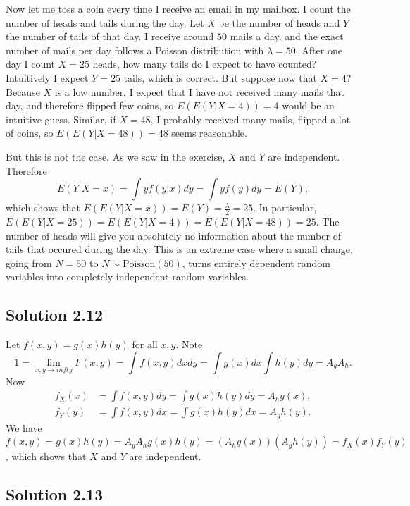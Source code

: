 Now let me toss a coin every time I receive an email in my mailbox.
I count the number of heads and tails during the day.
Let $X$ be the number of heads and $Y$ the number of tails of that day.
I receive around $50$ mails a day, and the exact number of mails per day follows a Poisson distribution with $\lambda = 50$.
After one day I count $X = 25$ heads, how many tails do I expect to have counted?
Intuitively I expect $Y = 25$ tails, which is correct.
But suppose now that $X = 4$?
Because $X$ is a low number, I expect that I have not received many mails that day, and therefore flipped few coins, so $E(E(Y | X = 4)) = 4$ would be an intuitive guess.
Similar, if $X = 48$, I probably received many mails, flipped a lot of coins, so $E(E(Y | X = 48)) = 48$ seems reasonable.

But this is not the case.
As we saw in the exercise, $X$ and $Y$ are independent.
Therefore
$$
E(Y | X = x) = \int y f(y|x) dy = \int y f(y) dy = E(Y),
$$
which shows that $E(E(Y | X = x)) = E(Y) = \frac{\lambda}{2} = 25$.
In particular, $E(E(Y | X = 25)) = E(E(Y | X = 4)) = E(E(Y | X = 48)) = 25$.
The number of heads will give you absolutely no information about the number of tails that occured during the day.
This is an extreme case where a small change, going from $N = 50$ to $N \sim \mathrm{Poisson}(50)$, turns entirely dependent random variables into completely independent random variables.


\subsection*{Solution 2.12}

Let $f(x, y) = g(x) h(y)$ for all $x, y$.
Note
$$
1 = \lim_{x, y \to infty} F(x, y) = \int f(x, y) dx dy = \int g(x) dx \int h(y) dy = A_g A_h.
$$
Now
\begin{equation*}
    \begin{split}
        f_X(x) &= \int f(x, y) dy = \int g(x) h(y) dy = A_h g(x), \\
        f_Y(y) &= \int f(x, y) dx = \int g(x) h(y) dx = A_g h(y).
    \end{split}
\end{equation*}
We have $f(x, y) = g(x) h(y) = A_g A_h g(x) h(y) = (A_h g(x))(A_g h(y)) = f_X(x) f_Y(y)$, which shows that $X$ and $Y$ are independent.


\subsection*{Solution 2.13}

